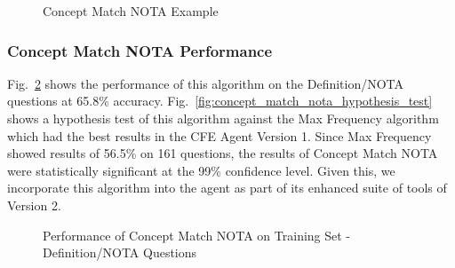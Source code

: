 \begin{figure}
\centering
\vspace{0.75in}
\caption{Concept Match NOTA Example}
\label{fig:concept_match_nota_example}
\end{figure}

\subsubsection{Concept Match NOTA Performance}

Fig.~\ref{fig:concept_match_nota_training_set_performance} shows the performance of this algorithm on the Definition/NOTA questions at 65.8\% accuracy.  Fig.~\ref{fig:concept_match_nota_hypothesis_test} shows a hypothesis test of this algorithm against the Max Frequency algorithm which had the best results in the CFE Agent Version 1.  Since Max Frequency showed results of 56.5\% on 161 questions, the results of Concept Match NOTA were statistically significant at the 99\% confidence level.  Given this, we incorporate this algorithm into the agent as part of its enhanced suite of tools of Version 2.

\begin{figure}
\centering
\vspace{0.75in}
\caption{Performance of Concept Match NOTA on Training Set - Definition/NOTA Questions}
\label{fig:concept_match_nota_training_set_performance}
\end{figure}



